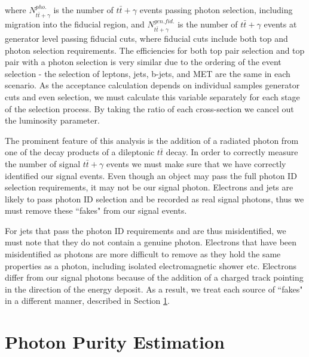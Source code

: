 where $N_{t\bar{t}+\gamma}^{pho.}$ is the number of $t\bar{t}+\gamma$ events passing photon selection, including migration into the fiducial region, and $N_{t\bar{t}+\gamma}^{gen. fid.}$ is the number of $t\bar{t}+\gamma$ events at generator level passing fiducial cuts, where fiducial cuts include both top and photon selection requirements. The efficiencies for both top pair selection and top pair with a photon selection is very similar due to the ordering of the event selection - the selection of leptons, jets, b-jets, and MET are the same in each scenario. As the acceptance calculation depends on individual samples generator cuts and even selection, we must calculate this variable separately for each stage of the selection process. By taking the ratio of each cross-section we cancel out the luminosity parameter.

The prominent feature of this analysis is the addition of a radiated photon from one of the decay products of a dileptonic $t\bar{t}$ decay. In order to correctly measure the number of signal $t\bar{t}+\gamma$ events we must make sure that we have correctly identified our signal events. Even though an object may pass the full photon ID selection requirements, it may not be our signal photon. Electrons and jets are likely to pass photon ID selection and be recorded as real signal photons, thus we must remove these ``fakes" from our signal events.

For jets that pass the photon ID requirements and are thus misidentified, we must note that they do not contain a genuine photon. Electrons that have been misidentified as photons are more difficult to remove as they hold the same properties as a photon, including isolated electromagnetic shower etc. Electrons differ from our signal photons because of the addition of a charged track pointing in the direction of the energy deposit. As a result, we treat each source of ``fakes" in a different manner, described in Section \ref{sec-PhotonPurityEstimation}.





\section{Photon Purity Estimation} \label{sec-PhotonPurityEstimation}

